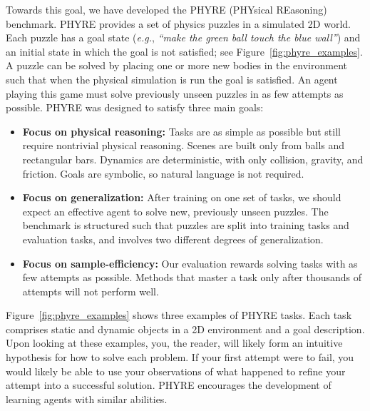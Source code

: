 \documentclass{article}
\begin{document}
Towards this goal, we have developed the PHYRE (PHYsical REasoning) benchmark. PHYRE provides a set of physics puzzles in a simulated 2D world. Each puzzle has a goal state (\emph{e.g.}, \emph{``make the green ball touch the blue wall''}) and an initial state in which the goal is not satisfied; see Figure~\ref{fig:phyre_examples}. A puzzle can be solved by placing one or more new bodies in the environment such that when the physical simulation is run the goal is satisfied. An agent playing this game must solve previously unseen puzzles in as few attempts as possible. PHYRE was designed to satisfy three main goals:

\begin{itemize}[leftmargin=*]
\setlength\itemsep{0em}
  \item \textbf{Focus on physical reasoning:} Tasks are as simple as possible but still require nontrivial physical reasoning. Scenes are built only from balls and rectangular bars. Dynamics are deterministic, with only collision, gravity, and friction. Goals are symbolic, so natural language is not required.
  \item \textbf{Focus on generalization:} After training on one set of tasks, we should expect an effective agent to solve new, previously unseen puzzles. The benchmark is structured such that puzzles are split into training tasks and evaluation tasks, and involves two different degrees of generalization.  
  \item \textbf{Focus on sample-efficiency:} Our evaluation rewards solving tasks with as few attempts as possible. Methods that master a task only after thousands of attempts will not perform well.
\end{itemize}

Figure~\ref{fig:phyre_examples} shows three examples of PHYRE tasks. Each task comprises static and dynamic objects in a 2D environment and a goal description. Upon looking at these examples, you, the reader, will likely form an intuitive hypothesis for how to solve each problem. If your first attempt were to fail, you would likely be able to use your observations of what happened to refine your attempt into a successful solution. PHYRE encourages the development of learning agents with similar abilities.
\end{document}

